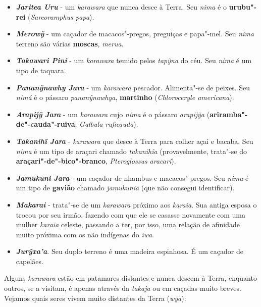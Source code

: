 \begin{itemize}
  \emph{\textbf{Haximixa'a}} -- ``gente lagarto/calango''. São caçadores
  de onça pintada (\emph{jawaruhua}).
\item
  \emph{\textbf{Jaritea Uru}} - um \emph{karawara} que nunca desce à
  Terra. Seu \emph{nima} é o \textbf{urubu"-rei} (\emph{Sarcoramphus
  papa}).
\item
  \emph{\textbf{Merowỹ}} - um caçador de macacos"-pregos, preguiças e
  papa"-mel. Seu \emph{nima} terreno são várias \textbf{moscas},
  \emph{merua}.
\item
  \emph{\textbf{Takawari Pini}} - um \emph{karawara} temido pelos
  \emph{tapỹna} do céu. Seu \emph{nima} é um tipo de taquara.
\item
  \emph{\textbf{Pananỹnawhy Jara}} - um \emph{karawara} pescador.
  Alimenta"-se de peixes. Seu \emph{nimá} é o pássaro
  \emph{pananỹnawhya}, \textbf{martinho} (\emph{Chloroceryle
  americana}).
\item
  \textbf{\emph{Arapijỹ} \emph{Jara}} - um \emph{karawara} cujo
  \emph{nima} é o pássaro \emph{arapijỹa}
  (\textbf{ariramba"-de"-cauda"-ruiva}, \emph{Galbula ruficauda}).
\item
  \textbf{\emph{Takanihĩ Jara}} - \emph{karawara} que desce à Terra para
  colher açaí e bacaba. Seu \emph{nima} é um tipo de araçari chamado
  \emph{takanihĩa} (provavelmente, trata"-se do
  \textbf{araçari"-de"-bico"-branco}, \emph{Pteroglossus aracari}).
\item
  \textbf{\emph{Jamukuni} \emph{Jara}} - um caçador de nhambus e
  macacos"-pregos. Seu \emph{nima} é um tipo de \textbf{gavião} chamado
  \emph{jamukunia} (que não consegui identificar).
\item
  \emph{\textbf{Makarai}} - trata"-se de um \emph{karawara} próximo aos
  \emph{karaia}. Sua antiga esposa o trocou por seu irmão, fazendo com
  que ele se casasse novamente com uma mulher \emph{karaia} celeste,
  passando a ter, por isso, uma relação de afinidade muito próxima com
  os não indígenas do \emph{iwa}.
\item
  \emph{\textbf{Jurỹxa'a}}. Seu duplo terreno é uma madeira espinhosa. É
  um caçador de capelães.
\end{itemize}

Alguns \emph{karawara} estão em patamares distantes e nunca descem à
Terra, enquanto outros, se a visitam, é apenas através da \emph{takaja}
ou em caçadas muito breves. Vejamos quais seres vivem muito distantes da
Terra (\emph{wya}):

